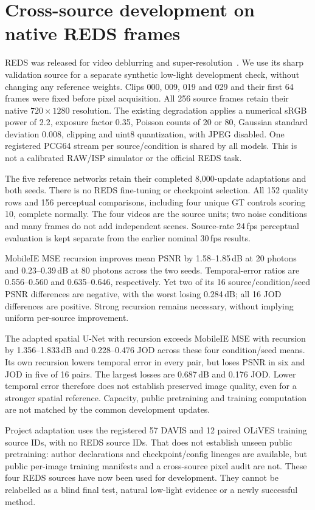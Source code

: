 \section{Cross-source development on native REDS frames}
\label{sec:external-reds}
REDS was released for video deblurring and super-resolution~\cite{reds}.
We use its sharp validation source for a separate synthetic low-light
development check, without changing any reference weights. Clips 000,
009, 019 and 029 and their first 64 frames were fixed before pixel
acquisition. All 256 source frames retain their native $720\times1280$
resolution. The existing degradation applies a numerical sRGB power of
2.2, exposure factor 0.35, Poisson counts of 20 or 80, Gaussian standard
deviation 0.008, clipping and uint8 quantization, with JPEG disabled.
One registered PCG64 stream per source/condition is shared by all models.
This is not a calibrated RAW/ISP simulator or the official REDS task.


The five reference networks retain their completed 8,000-update
adaptations and both seeds. There is no REDS fine-tuning or checkpoint
selection. All 152 quality rows and 156 perceptual comparisons, including
four unique GT controls scoring 10, complete normally. The four videos
are the source units; two noise conditions and many frames do not add
independent scenes. Source-rate 24\,fps perceptual evaluation is kept
separate from the earlier nominal 30\,fps results.

MobileIE MSE recursion improves mean PSNR by 1.58--1.85\,dB at 20 photons
and 0.23--0.39\,dB at 80 photons across the two seeds. Temporal-error
ratios are 0.556--0.560 and 0.635--0.646, respectively. Yet two of its 16
source/condition/seed PSNR differences are negative, with the worst losing
0.284\,dB; all 16 JOD differences are positive. Strong recursion remains
necessary, without implying uniform per-source improvement.

The adapted spatial U-Net with recursion exceeds MobileIE MSE with
recursion by 1.356--1.833\,dB and 0.228--0.476 JOD across these four
condition/seed means. Its own recursion lowers temporal error in every
pair, but loses PSNR in six and JOD in five of 16 pairs. The largest
losses are 0.687\,dB and 0.176 JOD. Lower temporal error therefore does
not establish preserved image quality, even for a stronger spatial
reference. Capacity, public pretraining and training computation are not
matched by the common development updates.

Project adaptation uses the registered 57 DAVIS and 12 paired OLiVES
training source IDs, with no REDS source IDs. That does not establish
unseen public pretraining: author declarations and checkpoint/config
lineages are available, but public per-image training manifests and a
cross-source pixel audit are not. These four REDS sources have now been
used for development. They cannot be relabelled as a blind final test,
natural low-light evidence or a newly successful method.
